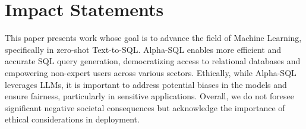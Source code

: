 \section*{Impact Statements}
\label{sec:statements}

This paper presents work whose goal is to advance the field of Machine Learning, specifically in zero-shot Text-to-SQL. Alpha-SQL enables more efficient and accurate SQL query generation, democratizing access to relational databases and empowering non-expert users across various sectors.
% 
Ethically, while Alpha-SQL leverages LLMs, it is important to address potential biases in the models and ensure fairness, particularly in sensitive applications. Overall, we do not foresee significant negative societal consequences but acknowledge the importance of ethical considerations in deployment.